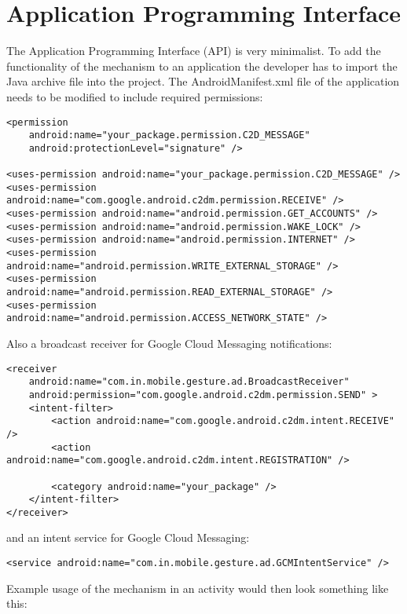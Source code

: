 \section{Application Programming Interface}

The Application Programming Interface (API) is very minimalist. To add the functionality of the mechanism to an application the developer has to import the Java archive file into the project. The AndroidManifest.xml file of the application needs to be modified to include required permissions:

\lstset{language=XML}
\begin{lstlisting}
<permission
    android:name="your_package.permission.C2D_MESSAGE"
    android:protectionLevel="signature" />

<uses-permission android:name="your_package.permission.C2D_MESSAGE" />
<uses-permission android:name="com.google.android.c2dm.permission.RECEIVE" />
<uses-permission android:name="android.permission.GET_ACCOUNTS" />
<uses-permission android:name="android.permission.WAKE_LOCK" />
<uses-permission android:name="android.permission.INTERNET" />
<uses-permission android:name="android.permission.WRITE_EXTERNAL_STORAGE" />
<uses-permission android:name="android.permission.READ_EXTERNAL_STORAGE" />
<uses-permission android:name="android.permission.ACCESS_NETWORK_STATE" />
\end{lstlisting}

Also a broadcast receiver for Google Cloud Messaging notifications:

\begin{lstlisting}
<receiver
    android:name="com.in.mobile.gesture.ad.BroadcastReceiver"
    android:permission="com.google.android.c2dm.permission.SEND" >
    <intent-filter>
        <action android:name="com.google.android.c2dm.intent.RECEIVE" />
        <action android:name="com.google.android.c2dm.intent.REGISTRATION" />

        <category android:name="your_package" />
    </intent-filter>
</receiver>
\end{lstlisting}

and an intent service for Google Cloud Messaging:

\begin{lstlisting}
<service android:name="com.in.mobile.gesture.ad.GCMIntentService" />
\end{lstlisting}

Example usage of the mechanism in an activity would then look something like this:

